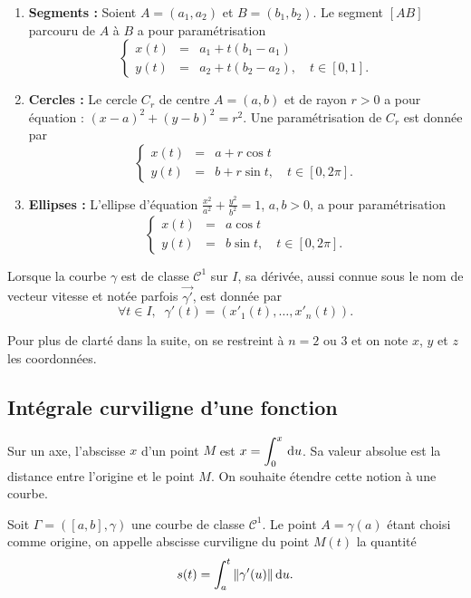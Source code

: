 \documentclass[class=report,crop=false]{standalone}
\begin{document}
\begin{enumerate}
\item {\bf Segments : }Soient $A=(a_1,a_2)$ et $B=(b_1,b_2)$. Le segment $[AB]$ parcouru de $A$ à $B$ a pour paramétrisation
$$\left\{\begin{array}{ccl}x(t)&=&a_1+t(b_1-a_1)\\ y(t)&=&a_2+t(b_2-a_2),\quad t\in [0,1].\end{array}\right.$$
\item{\bf Cercles : }Le cercle $C_r$ de centre $A=(a,b)$ et de rayon $r>0$ a pour équation : $(x-a)^2+(y-b)^2=r^2$. Une paramétrisation de $C_r$ est donnée par
$$\left\{\begin{array}{ccl}x(t)&=&a+r\cos t\\ y(t)&=&b+r\sin t,\quad t\in [0,2\pi ].\end{array}\right.$$
\item{\bf Ellipses : }L'ellipse d'équation $\displaystyle \frac{x^2}{a^2}+\frac{y^2}{b^2}=1$, $a,b>0$, a pour paramétrisation
$$\left\{\begin{array}{ccl}x(t)&=&a\cos t\\ y(t)&=&b\sin t,\quad t\in [0,2\pi ].\end{array}\right.$$
\end{enumerate}

\vskip4mm

\noindent Lorsque la courbe $\gamma$ est de classe ${\mathscr C}^1$ sur $I$, sa dérivée, aussi connue sous le nom de vecteur vitesse et notée parfois $\overrightarrow{\gamma '}$, est donnée par
$$\forall t\in I,\; \; \gamma '(t)=(x'_1(t),\dots ,x'_n(t)).$$

\vskip4mm

\noindent Pour plus de clarté dans la suite, on se restreint à $n=2$ ou $3$ et on note $x$, $y$ et $z$ les coordonnées.

\vskip8mm

\subsection{Intégrale curviligne d'une fonction}

\vskip4mm

\noindent Sur un axe, l'abscisse $x$ d'un point $M$ est $\displaystyle x=\int _0^x\,\mathrm{d} u$. Sa valeur absolue est la distance entre l'origine et le point $M$. On souhaite étendre cette notion à une courbe.

\vskip6mm

\begin{definition}Soit $\Gamma=([a,b],\gamma)$ une courbe de classe $\mathscr{C}^1$. Le point $A=\gamma (a)$ étant choisi comme origine, on appelle abscisse curviligne du point $M(t)$ la quantité
$$s(t)=\int _a^t\|\gamma '(u)\|\,\mathrm{d} u.$$
\end{definition}
\end{document}
